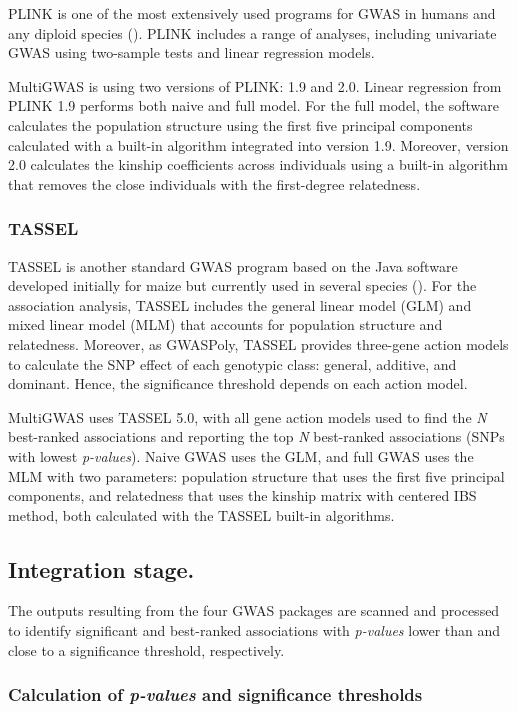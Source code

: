 \documentclass{article}
\begin{document}
PLINK is one of the most extensively used programs for GWAS in humans and any diploid species (\cite{Power2016}). PLINK includes a range of analyses, including univariate GWAS using two-sample tests and linear regression models.

MultiGWAS is using two versions of PLINK: 1.9 and 2.0. Linear regression from PLINK 1.9 performs both naive and full model. For the full model, the software calculates the population structure using the first five principal components calculated with a built-in algorithm integrated into version 1.9. Moreover, version 2.0 calculates the kinship coefficients across individuals using a built-in algorithm that removes the close individuals with the first-degree relatedness.

\subsubsection{TASSEL\label{subsec_TASSEL}}

TASSEL is another standard GWAS program based on the Java software developed initially for maize but currently used in several species (\cite{Alvarez2017, Zhang2018}). For the association analysis, TASSEL includes the general linear model (GLM) and mixed linear model (MLM) that accounts for population structure and relatedness. Moreover, as GWASPoly, TASSEL provides three-gene action models to calculate the SNP effect of each genotypic class: general, additive, and dominant. Hence, the significance threshold depends on each action model.

MultiGWAS uses TASSEL 5.0, with all gene action models used to find the \emph{N} best-ranked associations and reporting the top \emph{N} best-ranked associations (SNPs with lowest \emph{p-values}). Naive GWAS uses the GLM, and full GWAS uses the MLM with two parameters: population structure that uses the first five principal components, and relatedness that uses the kinship matrix with centered IBS method, both calculated with the TASSEL built-in algorithms. 


\subsection{Integration stage.}
The outputs resulting from the four GWAS packages are scanned and processed to identify significant and best-ranked associations with \emph{p-values} lower than and close to a significance threshold, respectively. 

\subsubsection{Calculation of \emph{p-values }and significance thresholds}
\end{document}
